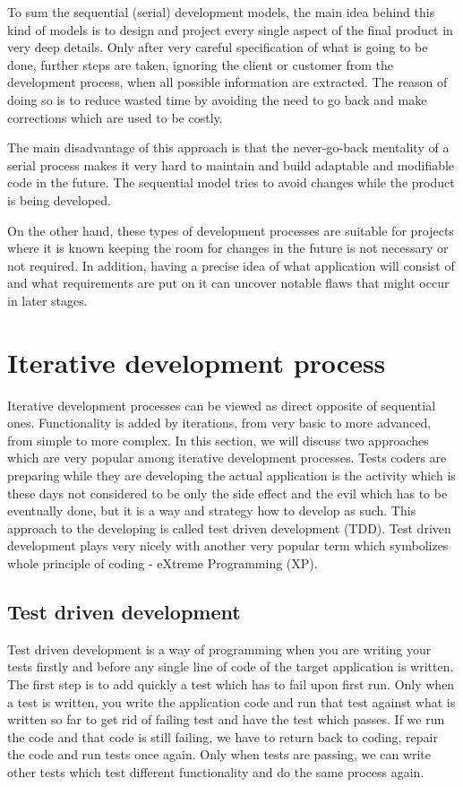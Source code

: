 \documentclass[12pt,final,oneside]{fithesis}
\begin{document}
To sum the sequential (serial) development models, the main idea behind this kind of models is to design and project every single aspect of the final product in very deep details. Only after very careful specification of what is going to be done, further steps are taken, ignoring the client or customer from the development process, when all possible information are extracted. The reason of doing so is to reduce wasted time by avoiding the need to go back and make corrections which are used to be costly.

The main disadvantage of this approach is that the never-go-back mentality of a serial process makes it very hard to maintain and build adaptable and modifiable code in the future. The sequential model tries to avoid changes while the product is being developed.

On the other hand, these types of development processes are suitable for projects where it is known keeping the room for changes in the future is not necessary or not required. In addition, having a precise idea of what application will consist of and what requirements are put on it can uncover notable flaws that might occur in later stages.

	\section{Iterative development process}

Iterative development processes can be viewed as direct opposite of sequential ones. Functionality is added by iterations, from very basic to more advanced, from simple to more complex. In this section, we will discuss two approaches which are very popular among iterative development processes. Tests coders are preparing while they are developing the actual application is the activity which is these days not considered to be only the side effect and the evil which has to be eventually done, but it is a way and strategy how to develop as such. This approach to the developing is called test driven development (TDD). Test driven development plays very nicely with another very popular term which symbolizes whole principle of coding - eXtreme Programming (XP).

	\subsection{Test driven development}
Test driven development is a way of programming when you are writing your tests firstly and before any single line of code of the target application is written. The first step is to add quickly a test which has to fail upon first run. Only when a test is written, you write the application code and run that test against what is written so far to get rid of failing test and have the test which passes. If we run the code and that code is still failing, we have to return back to coding, repair the code and run tests once again. Only when tests are passing, we can write other tests which test different functionality and do the same process again.
\end{document}
